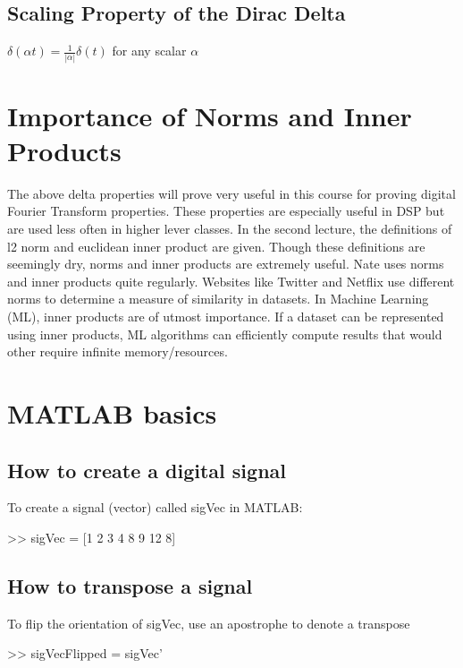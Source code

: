 \documentclass[11pt]{article}
\begin{document}
\subsection{Scaling Property of the Dirac Delta}

$\delta(\alpha t)= \frac{1}{|\alpha|} \delta(t)$ for any scalar $\alpha$

\section{Importance of Norms and Inner Products}
The above delta properties will prove very useful in this course for proving digital Fourier Transform properties. These properties are especially useful in DSP but are used less often in higher lever classes. \newline
In the second lecture, the definitions of l2 norm and euclidean inner product are given. Though these definitions are seemingly dry, norms and inner products are extremely useful. Nate uses norms and inner products quite regularly. Websites like Twitter and Netflix use different norms to determine a measure of similarity in datasets. In Machine Learning (ML), inner products are of utmost importance. If a dataset can be represented using inner products, ML algorithms can efficiently compute results that would other require infinite memory/resources.

\newpage

\section{MATLAB basics}

\subsection{How to create a digital signal}

To create a signal (vector) called sigVec in MATLAB:
\begin{center}
{ >> sigVec = [1 2 3 4 8 9 12 8]}


\end{center}

\subsection{How to transpose a signal}

To flip the orientation of sigVec, use an apostrophe to denote a transpose


\begin{center}
{ >> sigVecFlipped = sigVec' }

\end{center}
\end{document}
